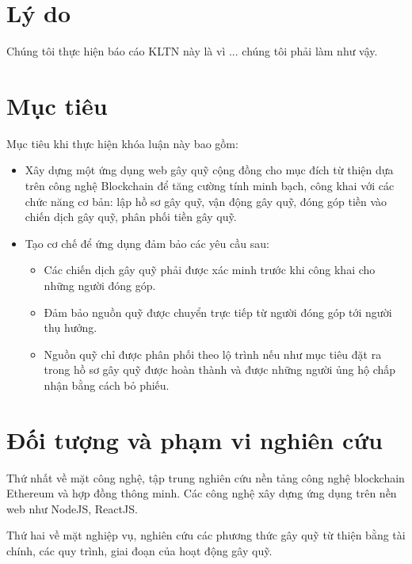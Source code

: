 \documentclass[../main-report.tex]{subfiles}
\begin{document}
\section{Lý do}
Chúng tôi thực hiện báo cáo KLTN này là vì ... chúng tôi phải làm như vậy.

\section{Mục tiêu}
Mục tiêu khi thực hiện khóa luận này bao gồm:

\begin{itemize}
\item Xây dựng một ứng dụng web gây quỹ cộng đồng cho mục đích từ thiện dựa trên công nghệ Blockchain để tăng cường tính minh bạch, công khai với các chức năng cơ bản: lập hồ sơ gây quỹ, vận động gây quỹ, đóng góp tiền vào chiến dịch gây quỹ, phân phối tiền gây quỹ.
\item Tạo cơ chế để ứng dụng đảm bảo các yêu cầu sau:
\begin{itemize}
\item Các chiến dịch gây quỹ phải được xác minh trước khi công khai cho những người đóng góp.
\item Đảm bảo nguồn quỹ được chuyển trực tiếp từ người đóng góp tới người thụ hưởng.
\item Nguồn quỹ chỉ được phân phối theo lộ trình nếu như mục tiêu đặt ra trong hồ sơ gây quỹ được hoàn thành và được những người ủng hộ chấp nhận bằng cách bỏ phiếu.
\end{itemize}
\end{itemize}

\section{Đối tượng và phạm vi nghiên cứu}
Thứ nhất về mặt công nghệ, tập trung nghiên cứu nền tảng công nghệ blockchain Ethereum và hợp đồng thông minh. Các công nghệ xây dựng ứng dụng trên nền web như NodeJS, ReactJS.

Thứ hai về mặt nghiệp vụ, nghiên cứu các phương thức gây quỹ từ thiện bằng tài chính, các quy trình, giai đoạn của hoạt động gây quỹ.
\end{document}
